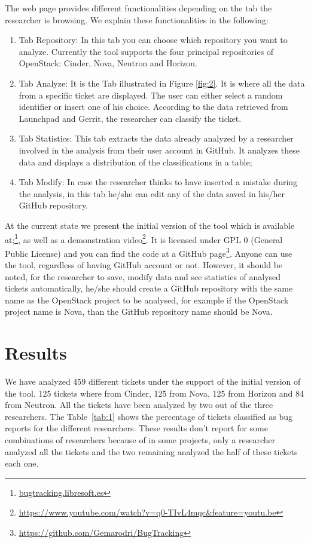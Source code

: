 \documentclass[runningheads,a4paper]{llncs}
\begin{document}
The web page provides different functionalities depending on the tab the researcher is browsing. We explain these functionalities in the following:
\begin{enumerate}
  \item Tab Repository: In this tab you can choose which repository you want to analyze. Currently the tool supports the four principal repositories of OpenStack: Cinder, Nova, Neutron and Horizon.
  \item Tab Analyze: It is the Tab illustrated in Figure \ref{fig:2}. It is where all the data from a specific ticket are displayed. The user can either select a random identifier or insert one of his choice. According to the data retrieved from Launchpad and Gerrit, the researcher can classify the ticket.%
  \item Tab Statistics: This tab extracts the data already analyzed by a researcher involved in the analysis from their user account in GitHub. It analyzes these data and displays a distribution of the classifications in a table;%
  \item Tab Modify: In case the researcher thinks to have inserted a mistake during the analysis, in this tab he/she can edit any of the data saved in his/her GitHub repository. 
\end{enumerate}

At the current state we present the initial version of the tool which is available at;\footnote{\url{bugtracking.libresoft.es}}, as well as a demonstration video\footnote{\url{https://www.youtube.com/watch?v=q0-TIvL4mqc&feature=youtu.be}}. It is licensed under GPL 0 (General Public License) and you can find the code at a GitHub page\footnote{\url{https://github.com/Gemarodri/BugTracking}}. Anyone can use the tool, regardless of having GitHub account or not. However, it should be noted, for the researcher to save, modify data and see statistics of analysed tickets automatically, he/she should create a GitHub repository with the same name as the OpenStack project to be analysed, for example if the OpenStack project name is Nova, than the GitHub repository name should be Nova. 

\section{Results}
\label{sec:4}
We have analyzed 459 different tickets under the support of the initial version of the tool. 125 tickets where from Cinder, 125 from Nova, 125 from Horizon and 84 from Neutron. All the tickets have been analyzed by two out of the three researchers. The Table~\ref{tab:1} shows the percentage of tickets classified as bug reports for the different researchers. These results don't report for some combinations of researchers because of in some projects, only a researcher analyzed all the tickets and the two remaining analyzed the half of these tickets each one. 
 
\end{document}
